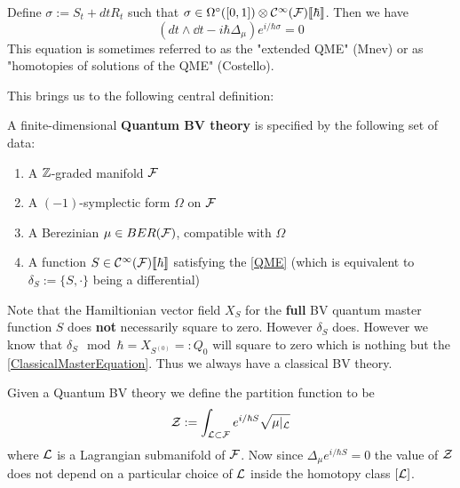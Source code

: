 \begin{definition}
  Define $\sigma := S_t + dt R_t$ such that $\sigma \in \Omega^\circ([0,1]) \otimes \mathcal{C}^{\infty}({\mathcal{F}})\llbracket\hbar\rrbracket$. Then we have
  \begin{equation}\tag{extQME} \label{extendedQME}
    \left( dt \wedge \dd{}{t} - i \hbar \Delta_\mu \right) e^{i/\hbar \sigma} = 0
  \end{equation}
  This equation is sometimes referred to as the "extended QME" (Mnev) or as "homotopies of solutions of the QME" (Costello).
\end{definition}

This brings us to the following central definition:

\begin{definition}
  A finite-dimensional \textbf{Quantum BV theory} is specified by the following set of data:
  \begin{enumerate}
    \item A $\mathbb{Z}$-graded manifold ${\mathcal{F}}$
    \item A $(-1)$-symplectic form $\Omega$ on ${\mathcal{F}}$
    \item A Berezinian $\mu \in BER({\mathcal{F}})$, compatible with $\Omega$
    \item A function $S \in \mathcal{C}^{\infty}({\mathcal{F}})\llbracket\hbar\rrbracket$ satisfying the \eqref{QME} (which is equivalent to $\delta_S := \{S, \cdot\}$ being a differential)
  \end{enumerate}
\end{definition}

\begin{rem}
  Note that the Hamiltionian vector field $X_S$ for the \textbf{full} BV quantum master function $S$ does \textbf{not} necessarily square to zero. However $\delta_S$ does. However we know that $\delta_S \mod \hbar = X_{S^{(0)}} =: Q_0$ will square to zero which is nothing but the \eqref{ClassicalMasterEquation}. Thus we always have a classical BV theory.
\end{rem}

Given a Quantum BV theory we define the partition function to be
\begin{equation}
  \mathcal{Z} := \int_{\mathcal{L} \subset {\mathcal{F}}} e^{i/\hbar S} \sqrt{\mu|_{\mathcal{L}}}
\end{equation}
where $\mathcal{L}$ is a Lagrangian submanifold of ${\mathcal{F}}$. Now since $\Delta_\mu e^{i/\hbar S} = 0$ the value of $\mathcal{Z}$ does not depend on a particular choice of $\mathcal{L}$ inside the homotopy class $[\mathcal{L}]$.\\

